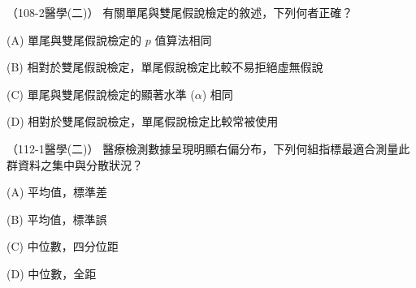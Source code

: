     \begin{docexam}{（108-2醫學(二)）}
        有關單尾與雙尾假說檢定的敘述，下列何者正確？

        (A) 單尾與雙尾假說檢定的 $p$ 值算法相同

        (B) 相對於雙尾假說檢定，單尾假說檢定比較不易拒絕虛無假說

        (C) 單尾與雙尾假說檢定的顯著水準 ($\alpha$) 相同 

        (D) 相對於雙尾假說檢定，單尾假說檢定比較常被使用
    \end{docexam}

    \begin{docexam}{（112-1醫學(二)）}
        醫療檢測數據呈現明顯右偏分布，下列何組指標最適合測量此群資料之集中與分散狀況？

        (A) 平均值，標準差

        (B) 平均值，標準誤

        (C) 中位數，四分位距

        (D) 中位數，全距
    \end{docexam}
    